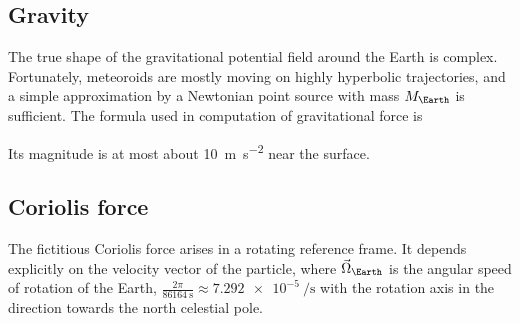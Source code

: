 %
%



    \subsection{Gravity} \label{dfg}
        The true shape of the gravitational potential field around the Earth is complex.
        Fortunately, meteoroids are mostly moving on highly hyperbolic trajectories,
        and a simple approximation by a Newtonian point source with mass $M_\Earth$ is sufficient.
        The formula used in computation of gravitational force is

        Its magnitude is at most about \SI{10}{\metre\per\second\squared} near the surface.

    \subsection{Coriolis force} \label{dfC}
        The fictitious Coriolis force arises in a rotating reference frame.
        It depends explicitly on the velocity vector of the particle,
        where $\vec{\Omega}_\Earth$ is the angular speed of rotation of the Earth,
        $\frac{2\pi}{\SI{86164}{\second}} \approx \SI{7.292e-5}{\per\second}$
        with the rotation axis in the direction towards the north celestial pole.

